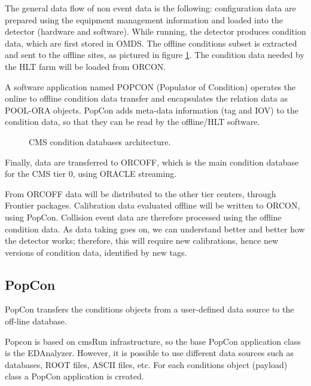 \documentclass[a4paper]{jpconf}
\begin{document}
The general data flow of non event data is the following: configuration data are prepared using the equipment management information and loaded into the detector (hardware and software). 
While running, the detector produces condition data, which are first stored in OMDS. 
The offline conditions subset is extracted and sent to the offline sites, as pictured in figure \ref{fig:CondDBArchitecture}. 
The condition data needed by the HLT farm will be loaded from ORCON. 

A software application named POPCON (Populator of Condition) operates the online to offline condition data transfer and encapsulates the relation data as POOL-ORA objects. 
PopCon adds meta-data information (tag and IOV) to the condition data, so that they can be read by the offline/HLT software. 

\begin{figure}[hbtp]
  \begin{center}
     \caption{CMS condition databases architecture.}
    \label{fig:CondDBArchitecture}
  \end{center}
\end{figure}

Finally, data are transferred to ORCOFF, which is the main condition database for the CMS tier 0, using ORACLE streaming.

From ORCOFF data will be distributed to the other tier centers, through Frontier\cite{FRONTIER} packages. 
Calibration data evaluated offline will be written to ORCON, using PopCon. 
Collision event data are therefore processed using the offline condition data. 
As data taking goes on, we can understand better and better how the detector works; therefore, this will require new calibrations, hence new versions of condition data, identified by new tags.


\subsection{PopCon}\label{subsect:POPCON}

PopCon transfers the conditions objects from a user-defined data source to the off-line database.

Popcon is based on cmsRun infrastructure, so the base PopCon application class is the EDAnalyzer. 
However, it is possible to use different data sources such as databases, ROOT files, ASCII files, etc. 
For each conditions object (payload) class a PopCon application is created.
\end{document}
